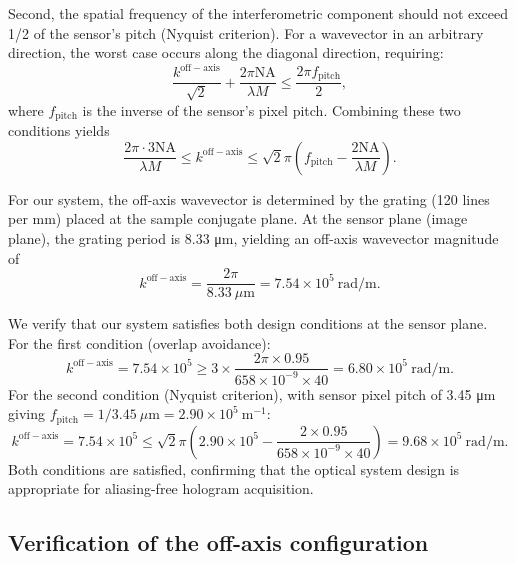 Second, the spatial frequency of the interferometric component should not exceed 1/2 of the sensor's pitch (Nyquist criterion). For a wavevector in an arbitrary direction, the worst case occurs along the diagonal direction, requiring:
\begin{equation}
\frac{k^{\mathrm{off-axis}}}{\sqrt{2}} + \frac{2\pi \mathrm{NA}}{\lambda M} \leq \frac{2\pi f_{\mathrm{pitch}}}{2},
\end{equation}
where $f_{\mathrm{pitch}}$ is the inverse of the sensor's pixel pitch. Combining these two conditions yields
\begin{equation}
\frac{2\pi \cdot 3\mathrm{NA}}{\lambda M} \leq k^{\mathrm{off-axis}} \leq \sqrt{2}\pi \left(f_{\mathrm{pitch}} - \frac{2\mathrm{NA}}{\lambda M}\right).
\end{equation}

For our system, the off-axis wavevector is determined by the grating (120 lines per mm) placed at the sample conjugate plane. At the sensor plane (image plane), the grating period is 8.33 μm, yielding an off-axis wavevector magnitude of
\begin{equation}
k^{\mathrm{off-axis}} = \frac{2\pi}{8.33~\mu\mathrm{m}} = 7.54 \times 10^5~\mathrm{rad/m}.
\end{equation}

We verify that our system satisfies both design conditions at the sensor plane. For the first condition (overlap avoidance):
\begin{equation}
k^{\mathrm{off-axis}} = 7.54 \times 10^5 \geq 3 \times \frac{2\pi \times 0.95}{658 \times 10^{-9} \times 40} = 6.80 \times 10^5~\mathrm{rad/m}.
\end{equation}
For the second condition (Nyquist criterion), with sensor pixel pitch of 3.45 μm giving $f_{\mathrm{pitch}} = 1/3.45~\mu\mathrm{m} = 2.90 \times 10^5~\mathrm{m}^{-1}$:
\begin{equation}
k^{\mathrm{off-axis}} = 7.54 \times 10^5 \leq \sqrt{2}\pi \left(2.90 \times 10^5 - \frac{2 \times 0.95}{658 \times 10^{-9} \times 40}\right) = 9.68 \times 10^5~\mathrm{rad/m}.
\end{equation}
Both conditions are satisfied, confirming that the optical system design is appropriate for aliasing-free hologram acquisition.

\subsection{Verification of the off-axis configuration}

